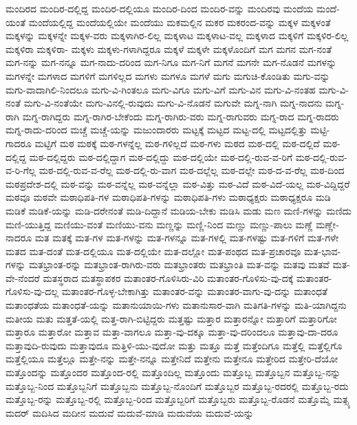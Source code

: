 {ಮಂದಿರದ
ಮಂದಿರ-ದಲ್ಲಿದ್ದ
ಮಂದಿರ-ದಲ್ಲಿಯೂ
ಮಂದಿರ-ದಿಂದ
ಮಂದಿರ-ವನ್ನು
ಮಂದಿರವು
ಮಂದೆಯ
ಮಂದೆ-ಯಂತೆ
ಮಂದೆಯಲ್ಲಿದ್ದ
ಮಂದೆಯಲ್ಲಿಯೇ
ಮಂದೆಯು
ಮಕಮಲ್ಲಿನ
ಮಕರ
ಮಕರಂದ-ವನ್ನು
ಮಕ್ಕಳ
ಮಕ್ಕಳಂತೆ
ಮಕ್ಕಳನ್ನು
ಮಕ್ಕಳನ್ನೇ
ಮಕ್ಕಳ-ವರು
ಮಕ್ಕಳಾಗಿರ-ಲಿಲ್ಲ
ಮಕ್ಕಳಾಟ
ಮಕ್ಕಳಾಟ-ವಲ್ಲ
ಮಕ್ಕಳಾದ
ಮಕ್ಕಳಿಗೆ
ಮಕ್ಕಳಿರ-ಲಿಲ್ಲ
ಮಕ್ಕಳಿರಾ
ಮಕ್ಕಳಿರಾ-
ಮಕ್ಕಳು
ಮಕ್ಕಳು-ಗಳಾಗಿದ್ದರೂ
ಮಕ್ಕಳೆ
ಮಕ್ಕಳೇ
ಮಕ್ಕಳೊಂದಿಗೆ
ಮಗ
ಮಗನ
ಮಗ-ನಂತೆ
ಮಗ-ನನ್ನು
ಮಗ-ನನ್ನೂ
ಮಗ-ನಾದು-ದರಿಂದ
ಮಗ-ನಿಗೂ
ಮಗ-ನಿಗೆ
ಮಗನೆ
ಮಗನೇ
ಮಗ-ನೊಡನೆ
ಮಗಳನ್ನು
ಮಗಳನ್ನೇ
ಮಗಳಾದ
ಮಗಳಿಗೆ
ಮಗಳಿಲ್ಲದ
ಮಗಳು
ಮಗಳೂ
ಮಗಳೆ
ಮಗು
ಮಗುಚಿ-ಕೊಂಡಿತು
ಮಗು-ವನ್ನು
ಮಗು-ವಾದಾಗಿಲಿ-ನಿಂದಲೂ
ಮಗು-ವಿ-ಗಿಂತಲೂ
ಮಗು-ವಿಗೂ
ಮಗು-ವಿಗೆ
ಮಗು-ವಿನ
ಮಗು-ವಿ-ನಂತಹ
ಮಗು-ವಿ-ನಂತೆ
ಮಗು-ವಿ-ನಂತೆಯೇ
ಮಗು-ವಿನಲ್ಲಿ-ರುವುದು
ಮಗು-ವಿ-ನೊಡನೆ
ಮಗುವೇ
ಮಗ್ನ-ನಾಗಿ
ಮಗ್ನ-ನಾದನು
ಮಗ್ನ-ರಾಗಿ
ಮಗ್ನ-ರಾಗಿದ್ದರು
ಮಗ್ನ-ರಾಗಿರ-ಬೇಕೆಂದು
ಮಗ್ನ-ರಾಗಿರು-ವರು
ಮಗ್ನ-ರಾಗುವರು
ಮಗ್ನ-ರಾದ
ಮಗ್ನ-ರಾದರು
ಮಗ್ನ-ರಾದು-ದರಿಂದ
ಮಚ್ಚೆ
ಮಚ್ಚೆ-ಯನ್ನು
ಮಜುಂದಾರರು
ಮಟ್ಟಕ್ಕೆ
ಮಟ್ಟದ
ಮಟ್ಟ-ದಲ್ಲಿ
ಮಟ್ಟದಲ್ಲಿತ್ತು
ಮಟ್ಟಿ-ಗಾದರೂ
ಮಟ್ಟಿಗೆ
ಮಠ
ಮಠಕ್ಕೆ
ಮಠ-ಗಳನ್ನೆಲ್ಲ
ಮಠ-ಗಳಿಲ್ಲದೆ
ಮಠ-ಗಳು
ಮಠದ
ಮಠ-ದಲ್ಲಿ
ಮಠ-ದಲ್ಲಿದೆ
ಮಠ-ದಲ್ಲಿದ್ದ
ಮಠ-ದಲ್ಲಿದ್ದರು
ಮಠ-ದಲ್ಲಿದ್ದಾಗ
ಮಠ-ದಲ್ಲಿದ್ದು
ಮಠ-ದಲ್ಲಿಯೇ
ಮಠ-ದಲ್ಲಿ-ರುವ-ವ-ರಿಗೆ
ಮಠ-ದಲ್ಲಿ-ರುವ-ವ-ರಿ-ಗೆಲ್ಲ
ಮಠ-ದಲ್ಲಿ-ರುವ-ವ-ರೆಲ್ಲ
ಮಠ-ದಲ್ಲಿ-ರು-ವಾಗ
ಮಠ-ದಲ್ಲೆಲ್ಲ
ಮಠ-ದಲ್ಲೇ
ಮಠ-ದ-ವ-ರೆಲ್ಲ
ಮಠ-ದಿಂದ
ಮಠಪ್ರದೇಶ-ದಲ್ಲಿ
ಮಠ-ವನ್ನು
ಮಠ-ವನ್ನೆಲ್ಲ
ಮಠ-ವನ್ನೆಲ್ಲಾ
ಮಠ-ವಿತ್ತು
ಮಠ-ವಿದೆ
ಮಠ-ವಿದೆ-ಯಲ್ಲ
ಮಠ-ವಿದ್ದಿದ್ದರೆ
ಮಠವೂ
ಮಠವೇ
ಮಠಾಧಿಪತಿ-ಗಳ
ಮಠಾಧಿಪತಿ-ಗಳನ್ನು
ಮಠಾಧಿಪತಿ-ಗಳು
ಮಠಾಧ್ಯಕ್ಷರು
ಮಠಾಧ್ಯಕ್ಷರೂ
ಮಡಿ
ಮಡಿಕೆ
ಮಡಿಕೆ-ಯನ್ನು
ಮಡಿ-ದರೇನಂತೆ
ಮಡಿ-ದಿದ್ದಾನೆ
ಮಡಿಯ-ಬೇಕು
ಮಡಿಸಿ
ಮಡು
ಮಣ
ಮಣಿ-ಗಳನ್ನು
ಮಣಿದು
ಮಣಿ-ಯುತ್ತಿದ್ದ
ಮಣಿಯು-ವಂತೆ
ಮಣಿಯು-ವನು
ಮಣ್ಣನ್ನು
ಮಣ್ಣಿ-ನಿಂದ
ಮಣ್ಣು
ಮಣ್ಣು-ಪಾಲು
ಮಣ್ಣೆ
ಮಣ್ಣೇ-ನಾದರೂ
ಮತ
ಮತಕ್ಕೆ
ಮತ-ಗಳ
ಮತ-ಗಳನ್ನು
ಮತ-ಗಳನ್ನೂ
ಮತ-ಗಳಲ್ಲಿ
ಮತ-ಗಳಷ್ಟು
ಮತ-ಗಳಿಗೆ
ಮತ-ಗಳೇ
ಮತದ
ಮತ-ದಂತೆ
ಮತ-ದಲ್ಲಿಯೂ
ಮತ-ದಲ್ಲಿಯೇ
ಮತ-ದಲ್ಲೋ
ಮತ-ಪಂಥದ
ಮತ-ಪ್ರಚಾರವೂ
ಮತ-ಭಾವ-ಗಳನ್ನು
ಮತಭ್ರಾಂತ-ರನ್ನು
ಮತಭ್ರಾಂತ-ರಾಗಿರು-ವರು
ಮತಭ್ರಾಂತರು
ಮತಭ್ರಾಂತಿ
ಮತ-ವನ್ನು
ಮತವು
ಮತವೆ
ಮತ-ವೇ-ನೆಂದರೆ
ಮತಸ್ಥರಾದ
ಮತಸ್ಥಾಪಕರ
ಮತಾಂತರ-ಗೊಳಿಸಿರು-ವಿರಿ
ಮತಾಂತರ-ಗೊಳಿಸು-ವು-ದಕ್ಕೆ
ಮತಾಂತರ-ಗೊಳಿಸು-ವು-ದಲ್ಲ
ಮತಾಂತರ-ಗೊಳ್ಳ-ಬೇಕಾಗಿತ್ತು
ಮತಾಂತರ-ವನ್ನು
ಮತಾಂತರ-ವಾಗು-ವು-ದನ್ನು
ಮತಾಂಧತೆ
ಮತಾಂಧತೆಯ
ಮತಾಂಧತೆ-ಯನ್ನು
ಮತಾನುಯಾಯಿ-ಗಳು
ಮತಾನುಸಾರ-ವಾಗಿ
ಮತಿಗತಿ-ಗಳನ್ನು
ಮತಿ-ಯಾಗಿದ್ದನು
ಮತೀಯ
ಮತು
ಮತ್ತತೆ-ಯಲ್ಲಿ
ಮತ್ತ-ರಾಗಿ-ಬಿಟ್ಟಿದ್ದರು
ಮತ್ತಷ್ಟು
ಮತ್ತಾರ
ಮತ್ತಾರನ್ನೋ
ಮತ್ತಾರಿಗೆ
ಮತ್ತಾರಿಗೋ
ಮತ್ತಾರೂ
ಮತ್ತಾರೋ
ಮತ್ತಾವ
ಮತ್ತಾ-ವಾಗಲೂ
ಮತ್ತಾ-ವು-ದಕ್ಕೂ
ಮತ್ತಾ-ವು-ದರಿಂದಲೂ
ಮತ್ತಾವು-ದಾ-ದರೂ
ಮತ್ತಾವುದಿ-ರುವುದು
ಮತ್ತಾವುದೂ
ಮತ್ತಿಳಿ-ಯು-ವುದೋ
ಮತ್ತು
ಮತ್ತೂ
ಮತ್ತೆ
ಮತ್ತೆಂದಿಗೂ
ಮತ್ತೆಲ್ಲಿ
ಮತ್ತೆಲ್ಲಿಗೊ
ಮತ್ತೆಲ್ಲಿಯೂ
ಮತ್ತೆಲ್ಲೂ
ಮತ್ತೇ-ನನ್ನು
ಮತ್ತೇ-ನನ್ನೂ
ಮತ್ತೇನಿದೆ
ಮತ್ತೇನು
ಮತ್ತೇನೂ
ಮತ್ತೇರಿದ
ಮತ್ತೇರಿ-ದೆಯೋ
ಮತ್ತೊಂದನ್ನು
ಮತ್ತೊಂದರ
ಮತ್ತೊಂದ-ರಲ್ಲಿ
ಮತ್ತೊಂದಿಲ್ಲ
ಮತ್ತೊಂದು
ಮತ್ತೊಬ್ಬ
ಮತ್ತೊಬ್ಬನ
ಮತ್ತೊಬ್ಬ-ನನ್ನು
ಮತ್ತೊಬ್ಬ-ನಿಂದ
ಮತ್ತೊಬ್ಬನಿಗೆ
ಮತ್ತೊಬ್ಬನು
ಮತ್ತೊಬ್ಬ-ನೊಂದಿಗೆ
ಮತ್ತೊಬ್ಬರ
ಮತ್ತೊಬ್ಬ-ರದರಲ್ಲಿ
ಮತ್ತೊಬ್ಬ-ರದು
ಮತ್ತೊಬ್ಬ-ರನ್ನು
ಮತ್ತೊಬ್ಬ-ರಲ್ಲಿ
ಮತ್ತೊಬ್ಬ-ರಿಂದ
ಮತ್ತೊಬ್ಬರಿಗೆ
ಮತ್ತೊಬ್ಬರು
ಮತ್ತೊಬ್ಬ-ರೊಡನೆ
ಮತ್ತೊಮ್ಮೆ
ಮತ್ಸ್ಯ
ಮದರ್
ಮದಿಸಿದ
ಮದೀನ
ಮದುವೆ
ಮದುವೆ-ಮಾಡಿ
ಮದುವೆಯ
ಮದುವೆ-ಯನ್ನು
}
